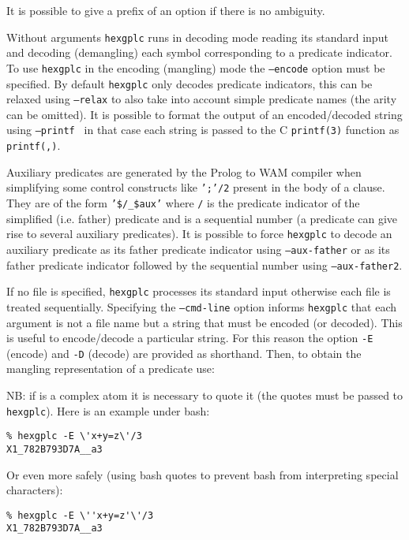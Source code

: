 It is possible to give a prefix of an option if there is no ambiguity.

Without arguments \texttt{hexgplc} runs in decoding mode reading its
standard input and decoding (demangling) each symbol corresponding to a predicate
indicator. To use \texttt{hexgplc} in the encoding (mangling) mode the
\texttt{--encode} option must be specified. By default \texttt{hexgplc} only
decodes predicate indicators, this can be relaxed using \texttt{--relax} to
also take into account simple predicate names (the arity can be omitted). It
is possible to format the output of an encoded/decoded string using
\texttt{--printf } in that case each string
 is passed to the C \texttt{printf(3)} function as
\texttt{printf(,)}.

Auxiliary predicates are generated by the Prolog to WAM compiler when
simplifying some control constructs like \texttt{';'/2} present in the body
of a clause. They are of the form
\texttt{'\$/\_\$aux'} where
\texttt{/} is the predicate indicator of the
simplified (i.e. father) predicate and  is a sequential
number (a predicate can give rise to several auxiliary predicates). It is
possible to force \texttt{hexgplc} to decode an auxiliary predicate as its
father predicate indicator using \texttt{--aux-father} or as its father
predicate indicator followed by the sequential number using
\texttt{--aux-father2}.

If no file is specified, \texttt{hexgplc} processes its standard input
otherwise each file is treated sequentially. Specifying the
\texttt{--cmd-line} option informs \texttt{hexgplc} that each argument is not
a file name but a string that must be encoded (or decoded). This is useful to
encode/decode a particular string. For this reason the option \texttt{-E}
(encode) and \texttt{-D} (decode) are provided as
shorthand.  Then, to obtain the mangling representation of a predicate
 use:


NB: if  is a complex atom it is necessary to quote it 
(the quotes must be passed to \texttt{hexgplc}). Here is an example under bash:

\begin{Indentation}
\begin{verbatim}
% hexgplc -E \'x+y=z\'/3
X1_782B793D7A__a3
\end{verbatim}
\end{Indentation}

Or even more safely (using bash quotes to prevent bash from interpreting special characters):

\begin{Indentation}
\begin{verbatim}
% hexgplc -E \''x+y=z'\'/3
X1_782B793D7A__a3
\end{verbatim}
\end{Indentation}


